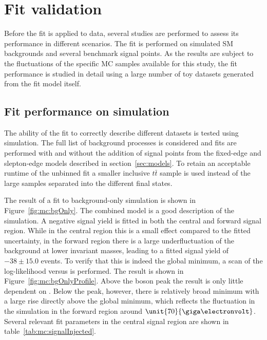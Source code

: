 \section{Fit validation}
Before the fit is applied to data, several studies are performed to assess its performance in different scenarios. The fit is performed on simulated SM backgrounds and several benchmark signal points. As the results are subject to the fluctuations of the specific MC samples available for this study, the fit performance is studied in detail using a large number of toy datasets generated from the fit model itself. 
\subsection{Fit performance on simulation}
The ability of the fit to correctly describe different datasets is tested using simulation. The full list of background processes is considered and fits are performed with and without the addition of signal points from the fixed-edge and slepton-edge models described in section~\ref{sec:models}. To retain an acceptable runtime of the unbinned fit a smaller inclusive $t\bar{t}$ sample is used instead of the large samples separated into the different final states. 

The result of a fit to background-only simulation is shown in Figure~\ref{fig:mc:bgOnly}. The combined model is a good description of the simulation. A negative signal yield is fitted in both the central and forward signal region. While in the central region this is a small effect compared to the fitted uncertainty, in the forward region there is a large underfluctuation of the background at lower invariant masses, leading to a fitted signal yield of $-38\pm15.0$ events. To verify that this is indeed the global minimum, a scan of the log-likelihood versus \mlledge is performed. The result is shown in Figure~\ref{fig:mc:bgOnlyProfile}. Above the \Z boson peak the result is only little dependent on \mlledge. Below the peak, however, there is relatively broad minimum with a large rise directly above the global minimum, which reflects the fluctuation in the simulation in the forward region around $\unit{70}{\giga\electronvolt}$. Several relevant fit parameters in the central signal region are shown in table~\ref{tab:mc:signalInjected}.

